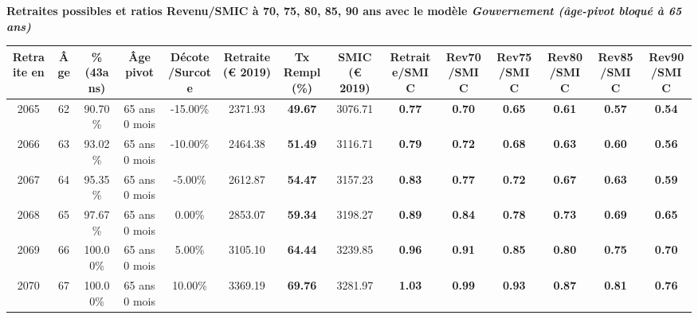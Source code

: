 {\bf \noindent Retraites possibles et ratios Revenu/SMIC à 70, 75, 80, 85, 90 ans avec le modèle \emph{Gouvernement (âge-pivot bloqué à 65 ans)}}  
 
\begin{adjustbox}{max width=\textwidth} 
\begin{tabular}[htb]{|c|c||c|c|c||c|c||c||c|c|c|c|c|c|} 
\hline 
 Retraite en &  Âge &  \%(43ans) &  Âge pivot &  Décote/Surcote &  Retraite (\euro{} 2019) &  Tx Rempl(\%) &  SMIC (\euro{} 2019) &  Retraite/SMIC &  Rev70/SMIC &  Rev75/SMIC &  Rev80/SMIC &  Rev85/SMIC &  Rev90/SMIC \\ 
\hline \hline 
 2065 &  62 &  90.70\% &  65 ans 0 mois &  -15.00\% &  2371.93 &  {\bf 49.67} &  3076.71 &  {\bf {\color{red} 0.77}} &  {\bf {\color{red} 0.70}} &  {\bf {\color{red} 0.65}} &  {\bf {\color{red} 0.61}} &  {\bf {\color{red} 0.57}} &  {\bf {\color{red} 0.54}} \\ 
\hline 
 2066 &  63 &  93.02\% &  65 ans 0 mois &  -10.00\% &  2464.38 &  {\bf 51.49} &  3116.71 &  {\bf {\color{red} 0.79}} &  {\bf {\color{red} 0.72}} &  {\bf {\color{red} 0.68}} &  {\bf {\color{red} 0.63}} &  {\bf {\color{red} 0.60}} &  {\bf {\color{red} 0.56}} \\ 
\hline 
 2067 &  64 &  95.35\% &  65 ans 0 mois &  -5.00\% &  2612.87 &  {\bf 54.47} &  3157.23 &  {\bf {\color{red} 0.83}} &  {\bf {\color{red} 0.77}} &  {\bf {\color{red} 0.72}} &  {\bf {\color{red} 0.67}} &  {\bf {\color{red} 0.63}} &  {\bf {\color{red} 0.59}} \\ 
\hline 
 2068 &  65 &  97.67\% &  65 ans 0 mois &  0.00\% &  2853.07 &  {\bf 59.34} &  3198.27 &  {\bf {\color{red} 0.89}} &  {\bf {\color{red} 0.84}} &  {\bf {\color{red} 0.78}} &  {\bf {\color{red} 0.73}} &  {\bf {\color{red} 0.69}} &  {\bf {\color{red} 0.65}} \\ 
\hline 
 2069 &  66 &  100.00\% &  65 ans 0 mois &  5.00\% &  3105.10 &  {\bf 64.44} &  3239.85 &  {\bf {\color{red} 0.96}} &  {\bf {\color{red} 0.91}} &  {\bf {\color{red} 0.85}} &  {\bf {\color{red} 0.80}} &  {\bf {\color{red} 0.75}} &  {\bf {\color{red} 0.70}} \\ 
\hline 
 2070 &  67 &  100.00\% &  65 ans 0 mois &  10.00\% &  3369.19 &  {\bf 69.76} &  3281.97 &  {\bf 1.03} &  {\bf {\color{red} 0.99}} &  {\bf {\color{red} 0.93}} &  {\bf {\color{red} 0.87}} &  {\bf {\color{red} 0.81}} &  {\bf {\color{red} 0.76}} \\ 
\hline 
\hline 
\end{tabular} 
\end{adjustbox} 
 
